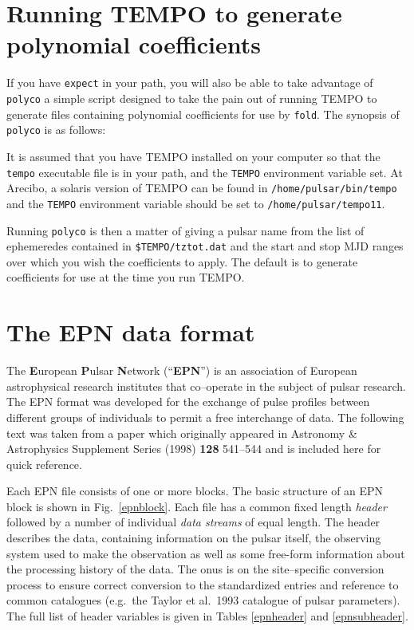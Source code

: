 \documentclass[11pt]{article}
\begin{document}
\section{Running {\sc TEMPO} to generate polynomial coefficients}
\label{polyco}
If you have {\tt expect} in your path, you will also be able
to take advantage of {\tt polyco} a simple script designed
to take the pain out of running {\sc TEMPO} to generate 
files containing polynomial coefficients for use by {\tt fold}.
The synopsis of {\tt polyco} is as follows:

It is assumed that you have {\sc TEMPO} installed on your
computer so that the {\tt tempo} executable file is in
your path, and the {\tt TEMPO} environment variable set.
At Arecibo, a solaris version of {\sc TEMPO} can be found
in {\tt /home/pulsar/bin/tempo} and the {\tt TEMPO} 
environment variable should be set to {\tt /home/pulsar/tempo11}.

Running {\tt polyco} is then a matter of giving a pulsar name
from the list of ephemeredes contained in \verb+$TEMPO/tztot.dat+
and the start and stop MJD ranges over which you wish the 
coefficients to apply. The default is to generate coefficients
for use at the time you run {\sc TEMPO}.

\section{The EPN data format}
\label{epn}
The {\bf E}uropean {\bf P}ulsar {\bf N}etwork (``{\bf EPN}'') is an
association of European astrophysical research institutes that
co--operate in the subject of pulsar research. The EPN format
was developed for the exchange of pulse profiles between different
groups of individuals to permit a free interchange of data.
The following text was taken from a paper which originally
appeared in Astronomy \& Astrophysics Supplement Series  (1998)
{\bf 128} 541--544 and is included here for quick reference.

Each EPN file consists of one or more blocks.  The basic structure
of an EPN block is shown in Fig.~\ref{epnblock}.  
Each file has a common fixed
length {\it header} followed by a number of individual {\it data
streams} of equal length. The header describes the data, containing
information on the pulsar itself, the observing system used to make
the observation as well as some free-form information about the
processing history of the data. The onus is on the site--specific
conversion process to ensure correct conversion to the standardized
entries and reference to common catalogues (e.g.~the Taylor et al.~1993
catalogue of pulsar
parameters).  The full list of header variables is given in Tables 
\ref{epnheader} and \ref{epnsubheader}.
\end{document}
